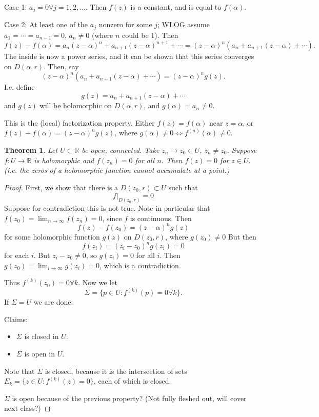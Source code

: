 \documentclass{artikel3}
\newcommand{\complex}{\mathbb{R}}
\newtheorem{thm}{Theorem}
\numberwithin{equation}{enumi}
\begin{document}
Case 1: $a_j=0\forall j=1,2,\ldots$.  Then $f(z)$ is a constant, and is equal
to $f(\alpha)$.

Case 2: At least one of the $a_j$ nonzero for some $j$; WLOG
assume $a_1=\cdots=a_{n-1}=0$, $a_n\neq 0$ (where $n$ could be $1$).  Then \[
	f(z)-f(\alpha)=a_n(z-\alpha)^n+a_{n+1}(z-\alpha)^{n+1}+\cdots
	= (z-\alpha)^n(a_n+a_{n+1}(z-\alpha)+\cdots).
\] The inside is now a power series, and it can
be shown that this series converges on $D(\alpha,r)$.  Then, say \[
	(z-\alpha)^n(a_n+a_{n+1}(z-\alpha)+\cdots)=(z-\alpha)^ng(z).
\] I.e. define \[
	g(z)=a_n+a_{n+1}(z-\alpha)+\cdots
\] and $g(z)$ will be holomorphic on $D(\alpha,r)$, and $g(\alpha)=a_n\neq 0$.

This is the (local) factorization property.  Either $f(z)=f(\alpha)$ near
$z=\alpha$, or $f(z)-f(\alpha)=(z-\alpha)^n g(z)$, where $g(\alpha)\neq 0\iff f^{(n)}(\alpha)\neq 0$.

\begin{thm}
	Let $U\subset \complex$ be open, connected.  Take $z_n\to z_0\in U$, $z_n\neq z_0$.
	Suppose $f:U\to\complex$ is holomorphic and $f(z_n)=0$ for all $n$.  Then $f(z)=0$
	for $z\in U$.  (i.e. the zeros of a holomorphic function cannot accumulate
	at a point.)
\end{thm}
\begin{proof}
	First, we show that there is a $D(z_0,r)\subset U$ such that \[
		f|_{D(z_0,r)}=0
	\] Suppose for contradiction this is not true.
	Note in particular that $f(z_0)=\lim_{n\to\infty}f(z_n)=0$,
	since $f$ is continuous.  Then \[
		f(z)-f(z_0)=(z-\alpha)^ng(z)
	\] for some holomorphic function $g(z)$ on $D(z_0,r)$, where $g(z_0)\neq 0$
	But then \[
		f(z_i)=(z_i-z_0)^n g(z_i)=0
	\] for each $i$.  But $z_i-z_0\neq 0$, so $g(z_i)=0$ for all $i$.
	Then $g(z_0)=\lim_{i\to\infty}g(z_i)=0$, which is a contradiction.
	
	Thus $f^{(k)}(z_0)=0\forall k$.  Now we let \[
		\Sigma=\{p\in U:f^{(k)}(p)=0\forall k\}.
	\] If $\Sigma=U$ we are done.
	
	Claims:
	\begin{itemize}
		\item
			$\Sigma$ is closed in $U$.
		\item
			$\Sigma$ is open in $U$.
	\end{itemize}
	Note that $\Sigma$ is closed, because it is the intersection
	of sets $E_k=\{z\in U:f^{(k)}(z)=0\}$, each of which is closed.
	
	$\Sigma$ is open because of the previous property? (Not fully fleshed out,
	will cover next class?)
\end{proof}
\label{lastpage}
\end{document}
